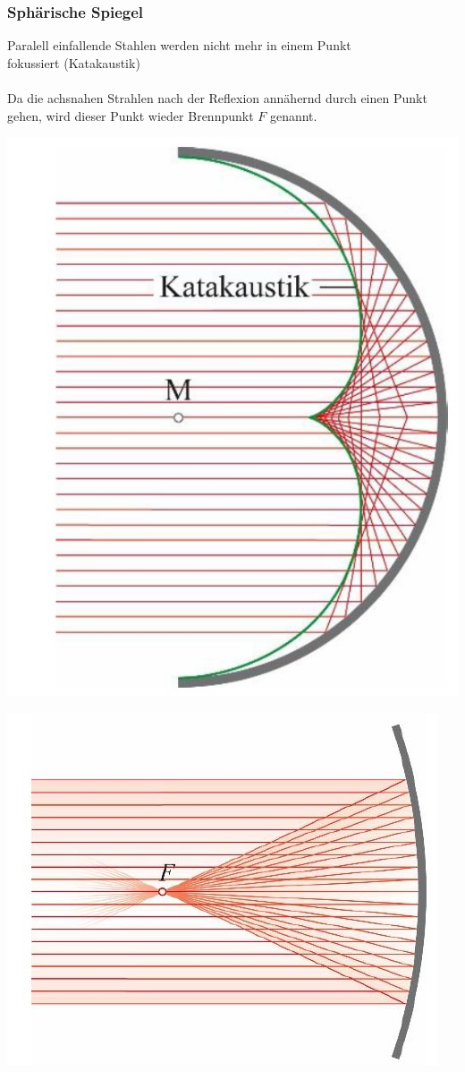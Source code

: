 \subsubsection{Sphärische Spiegel}

Paralell einfallende Stahlen werden nicht mehr in einem Punkt  \\
fokussiert (Katakaustik) \\
\\
Da die achsnahen Strahlen nach der Reflexion annähernd durch einen Punkt gehen, wird
dieser Punkt wieder Brennpunkt $F$ genannt. \\



\begin{minipage}{0.4\linewidth}
\includegraphics[width=0.8\linewidth]{Bilder/Wellen-Optik/sphaerischer_spiegel_2} 
\end{minipage}
\hfill
\begin{minipage}{0.4\linewidth}
\includegraphics[width=\linewidth]{Bilder/Wellen-Optik/sphaerischer_spiegel} 
\end{minipage}

